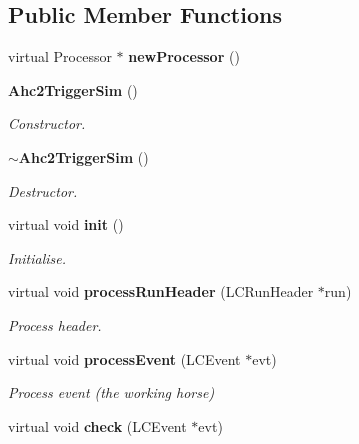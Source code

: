 \subsection*{Public Member Functions}
\begin{DoxyCompactItemize}
\item 
virtual Processor $\ast$ {\bfseries new\-Processor} ()\label{classCALICE_1_1Ahc2TriggerSim_a908c333749d8847017189ebeccc67f36}

\item 
{\bf Ahc2\-Trigger\-Sim} ()\label{classCALICE_1_1Ahc2TriggerSim_a1c994c4a99a30d71da81baaf73d709e7}

\begin{DoxyCompactList}\small\item\em Constructor. \end{DoxyCompactList}\item 
{\bf $\sim$\-Ahc2\-Trigger\-Sim} ()\label{classCALICE_1_1Ahc2TriggerSim_ad40eb8e475c728e4be82ea48018f85ca}

\begin{DoxyCompactList}\small\item\em Destructor. \end{DoxyCompactList}\item 
virtual void {\bf init} ()\label{classCALICE_1_1Ahc2TriggerSim_a037a2ce2ab0d11398dea77f8b998f05e}

\begin{DoxyCompactList}\small\item\em Initialise. \end{DoxyCompactList}\item 
virtual void {\bf process\-Run\-Header} (L\-C\-Run\-Header $\ast$run)\label{classCALICE_1_1Ahc2TriggerSim_a4aa0642673b0742092bd2f9a4ba43550}

\begin{DoxyCompactList}\small\item\em Process header. \end{DoxyCompactList}\item 
virtual void {\bf process\-Event} (L\-C\-Event $\ast$evt)\label{classCALICE_1_1Ahc2TriggerSim_a652e15f9aac83ecd3f80f347f0b4d8d7}

\begin{DoxyCompactList}\small\item\em Process event (the working horse) \end{DoxyCompactList}\item 
virtual void {\bf check} (L\-C\-Event $\ast$evt)\label{classCALICE_1_1Ahc2TriggerSim_a3e23709a27312703b0ef9f7f1dd70ddf}


\end{DoxyCompactItemize}
